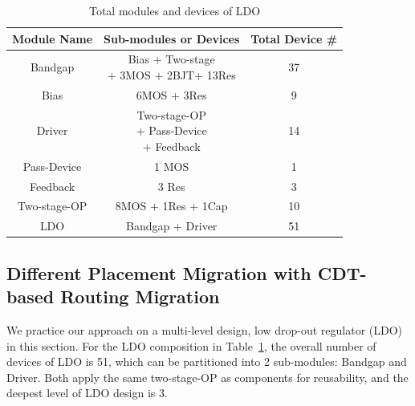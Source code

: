     \begin{table}[ht]
      \scriptsize
      \begin{center}
        \caption{Total modules and devices of LDO}\label{table:NumDeviceofLDO}
        \begin{tabular}{|c|c|c|}
        \toprule
        \hline
        Module Name &  Sub-modules or Devices & Total Device \# \\
        \hline
        Bandgap &  \tabincell{c}{Bias + Two-stage \\+ 3MOS + 2BJT+ 13Res} &  37\\
        \hline
        Bias  & 6MOS + 3Res & 9 \\
        \hline
        Driver & \tabincell{c}{Two-stage-OP\\ + Pass-Device\\ + Feedback} & 14\\
        \hline
        Pass-Device & 1 MOS & 1 \\
        \hline
        Feedback & 3 Res & 3\\
        \hline
        Two-stage-OP & 8MOS + 1Res + 1Cap & 10\\
        \hline
        LDO  & Bandgap + Driver & 51\\
        \hline
        \end{tabular}
      \end{center}
    \end{table}


  \subsection{Different Placement Migration with CDT-based Routing Migration}\label{subsec:ExpLDO}

    We practice our approach on a multi-level design, low drop-out regulator (LDO) in this section. For the LDO composition in Table~\ref{table:NumDeviceofLDO}, the overall number of devices of LDO is 51, which can be partitioned into 2 sub-modules: Bandgap and Driver. Both apply the same two-stage-OP as components for reusability, and the deepest level of LDO design is 3.

    

    

